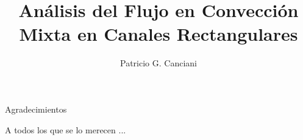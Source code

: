 \documentclass[12pt,screen,twoside]{ibtesis}
\title{Análisis del Flujo en Convección Mixta en Canales Rectangulares}
\author{Patricio G. Canciani}
\begin{document}

\begin{preliminary}



\begin{abreviaturas}
\end{abreviaturas}

\tableofcontents                %
\listoffigures                  %

\listoftables                   %



\end{preliminary}









%
\appendix






\begin{postliminary}


\begin{seccion}{Agradecimientos}
 
A todos los que se lo merecen ...
\end{seccion}

\end{postliminary}
\end{document}
